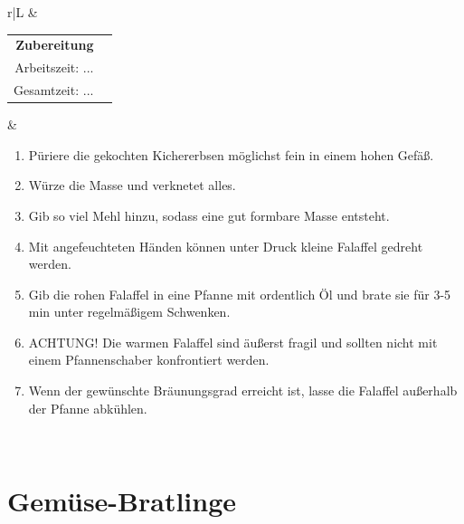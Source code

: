 \documentclass[a4paper, 12pt]{scrbook} 								%
\numberwithin{equation}{section} 									%
\begin{document}
\begin{tabularx}{\textwidth}{r|L}
								&	\\	
		\begin{tabular}[t]{rr}
			\textbf{Zubereitung}	\\
			Arbeitszeit: ...	\\
			Gesamtzeit:	...		\\
		\end{tabular}			&	\begin{enumerate}[nosep]
										\item Püriere die gekochten Kichererbsen möglichst fein in einem hohen Gefäß.
										\item Würze die Masse und verknetet alles.
										\item Gib so viel Mehl hinzu, sodass eine gut formbare Masse entsteht.
										\item Mit angefeuchteten Händen können unter Druck kleine Falaffel gedreht werden.
										\item Gib die rohen Falaffel in eine Pfanne mit ordentlich Öl und brate sie für 3-5 min unter regelmäßigem Schwenken.
										\item ACHTUNG! Die warmen Falaffel sind äußerst fragil und sollten nicht mit einem Pfannenschaber konfrontiert werden.
										\item Wenn der gewünschte Bräunungsgrad erreicht ist, lasse die Falaffel außerhalb der Pfanne abkühlen.
									\end{enumerate}	\\
	\end{tabularx}
	\newpage


	\section{Gemüse-Bratlinge}	\label{gemuese_bratlinge}
\end{document}
